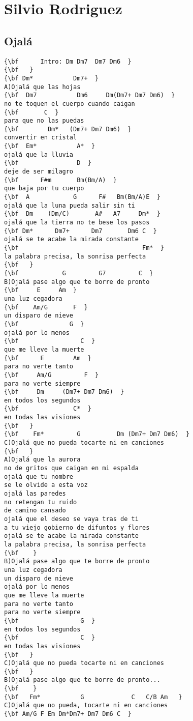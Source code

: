 \documentclass[a4paper]{article}
\begin{document}
\section{Silvio Rodriguez} %
\label{sec:Silvio Rodriguez}
\begin{multicols}{2}
\subsection{Ojal\'{a}} %
\label{sub:Ojal\'{a}}
\begin{Verbatim}[commandchars=\\\{\}]
{\bf 	  Intro: Dm Dm7  Dm7 Dm6  }
{\bf   }
{\bf Dm*           Dm7+  }
A)Ojalá que las hojas  
{\bf  Dm7           Dm6     Dm(Dm7+ Dm7 Dm6)  }
no te toquen el cuerpo cuando caigan  
{\bf       C  }
para que no las puedas  
{\bf        Dm*   (Dm7+ Dm7 Dm6)  }
convertir en cristal  
{\bf  Em*           A*  }
ojalá que la lluvia  
{\bf                D  }
deje de ser milagro   
{\bf      F#m       Bm(Bm/A)  }
que baja por tu cuerpo  
{\bf  A            G      F#   Bm(Bm/A)E  }
ojalá que la luna pueda salir sin ti  
{\bf  Dm    (Dm/C)       A#   A7     Dm*  }
ojalá que la tierra no te bese los pasos  
{\bf Dm*      Dm7+      Dm7       Dm6 C  }
ojalá se te acabe la mirada constante  
{\bf                                  Fm*  }
la palabra precisa, la sonrisa perfecta  
{\bf   }
{\bf            G         G7         C  }
B)Ojalá pase algo que te borre de pronto  
{\bf     E     Am  }
una luz cegadora  
{\bf    Am/G       F  }
un disparo de nieve  
{\bf              G  }
ojalá por lo menos  
{\bf                 C  }
que me lleve la muerte  
{\bf      E        Am  }
para no verte tanto  
{\bf     Am/G         F  }
para no verte siempre  
{\bf     Dm     (Dm7+ Dm7 Dm6)  }
en todos los segundos  
{\bf               C*  }
en todas las visiones  
{\bf   }
{\bf    Fm*         G          Dm (Dm7+ Dm7 Dm6)  }
C)Ojalá que no pueda tocarte ni en canciones  
{\bf   }
A)Ojalá que la aurora  
no de gritos que caigan en mi espalda  
ojalá que tu nombre  
se le olvide a esta voz  
ojalá las paredes  
no retengan tu ruido  
de camino cansado  
ojalá que el deseo se vaya tras de ti  
a tu viejo gobierno de difuntos y flores  
ojalá se te acabe la mirada constante  
la palabra precisa, la sonrisa perfecta  
{\bf    }
B)Ojalá pase algo que te borre de pronto  
una luz cegadora  
un disparo de nieve  
ojalá por lo menos  
que me lleve la muerte  
para no verte tanto  
para no verte siempre  
{\bf                 G  }
en todos los segundos  
{\bf                 C  }
en todas las visiones  
{\bf   }
C)Ojalá que no pueda tocarte ni en canciones  
{\bf   }
B)Ojalá pase algo que te borre de pronto...  
{\bf    }
{\bf   Fm*           G             C   C/B Am   }
C)Ojalá que no pueda, tocarte ni en canciones  
{\bf Am/G F Em Dm*Dm7+ Dm7 Dm6 C  }
\end{Verbatim}
\newpage
\end{multicols}
\end{document}
